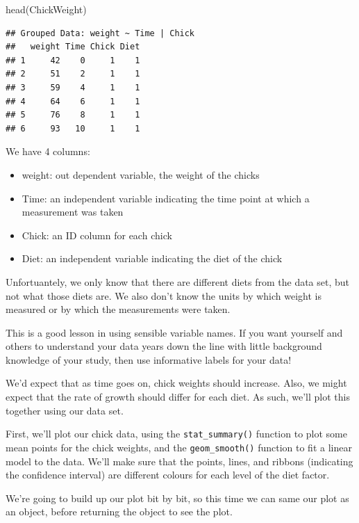 \documentclass[
]{book}
\newenvironment{Shaded}{\begin{snugshade}}{\end{snugshade}}
\newcommand{\FunctionTok}[1]{\textcolor[rgb]{0.00,0.00,0.00}{#1}}
\newcommand{\NormalTok}[1]{#1}
\providecommand{\tightlist}{%
  \setlength{\itemsep}{0pt}\setlength{\parskip}{0pt}}
\begin{document}
\begin{Shaded}
\begin{Highlighting}[]
\FunctionTok{head}\NormalTok{(ChickWeight)}
\end{Highlighting}
\end{Shaded}

\begin{verbatim}
## Grouped Data: weight ~ Time | Chick
##   weight Time Chick Diet
## 1     42    0     1    1
## 2     51    2     1    1
## 3     59    4     1    1
## 4     64    6     1    1
## 5     76    8     1    1
## 6     93   10     1    1
\end{verbatim}

We have 4 columns:

\begin{itemize}
\tightlist
\item
  weight: out dependent variable, the weight of the chicks
\item
  Time: an independent variable indicating the time point at which a measurement was taken
\item
  Chick: an ID column for each chick
\item
  Diet: an independent variable indicating the diet of the chick
\end{itemize}

Unfortuantely, we only know that there are different diets from the data set, but not what those diets are. We also don't know the units by which weight is measured or by which the measurements were taken.

This is a good lesson in using sensible variable names. If you want yourself and others to understand your data years down the line with little background knowledge of your study, then use informative labels for your data!

We'd expect that as time goes on, chick weights should increase. Also, we might expect that the rate of growth should differ for each diet. As such, we'll plot this together using our data set.

First, we'll plot our chick data, using the \texttt{stat\_summary()} function to plot some mean points for the chick weights, and the \texttt{geom\_smooth()} function to fit a linear model to the data. We'll make sure that the points, lines, and ribbons (indicating the confidence interval) are different colours for each level of the diet factor.

We're going to build up our plot bit by bit, so this time we can same our plot as an object, before returning the object to see the plot.
\end{document}
